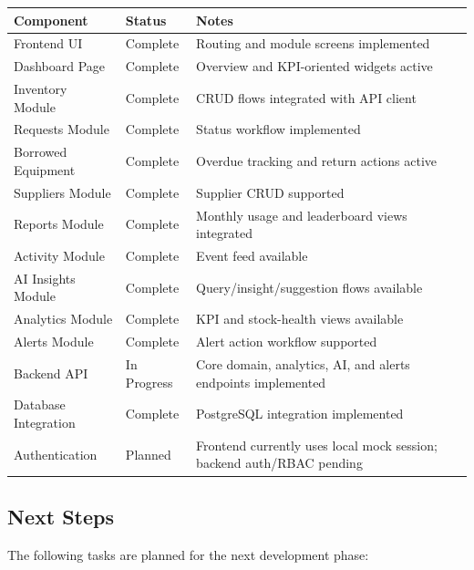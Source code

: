 \documentclass[12pt]{article}
\begin{document}
\begin{center}
\begin{tabular}{|l|l|l|}
\hline
\textbf{Component} & \textbf{Status} & \textbf{Notes} \\
\hline
Frontend UI & Complete & Routing and module screens implemented \\
Dashboard Page & Complete & Overview and KPI-oriented widgets active \\
Inventory Module & Complete & CRUD flows integrated with API client \\
Requests Module & Complete & Status workflow implemented \\
Borrowed Equipment & Complete & Overdue tracking and return actions active \\
Suppliers Module & Complete & Supplier CRUD supported \\
Reports Module & Complete & Monthly usage and leaderboard views integrated \\
Activity Module & Complete & Event feed available \\
AI Insights Module & Complete & Query/insight/suggestion flows available \\
Analytics Module & Complete & KPI and stock-health views available \\
Alerts Module & Complete & Alert action workflow supported \\
Backend API & In Progress & Core domain, analytics, AI, and alerts endpoints implemented \\
Database Integration & Complete & PostgreSQL integration implemented \\
Authentication & Planned & Frontend currently uses local mock session; backend auth/RBAC pending \\
\hline
\end{tabular}
\end{center}

\subsection{Next Steps}

The following tasks are planned for the next development phase:
\end{document}
